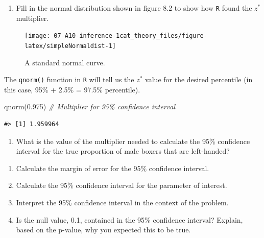 \documentclass[
]{report}
\newenvironment{Shaded}{\begin{snugshade}}{\end{snugshade}}
\newcommand{\CommentTok}[1]{\textcolor[rgb]{0.56,0.35,0.01}{\textit{#1}}}
\newcommand{\FloatTok}[1]{\textcolor[rgb]{0.00,0.00,0.81}{#1}}
\newcommand{\FunctionTok}[1]{\textcolor[rgb]{0.00,0.00,0.00}{#1}}
\newcommand{\NormalTok}[1]{#1}
\providecommand{\tightlist}{%
  \setlength{\itemsep}{0pt}\setlength{\parskip}{0pt}}
\begin{document}
\begin{enumerate}
\def\labelenumi{\arabic{enumi}.}
\setcounter{enumi}{14}
\tightlist
\item
  Fill in the normal distribution shown in figure 8.2 to show how \texttt{R} found the \(z^*\) multiplier.
\end{enumerate}

\begin{figure}

{\centering \texttt{[image: 07-A10-inference-1cat\_theory\_files/figure-latex/simpleNormaldist-1]} 

}

\caption{A standard normal curve.}\label{fig:simpleNormaldist}
\end{figure}

The \texttt{qnorm()} function in \texttt{R} will tell us the \(z^*\) value for the desired percentile (in this case, 95\% + 2.5\% = 97.5\% percentile).

\begin{Shaded}
\begin{Highlighting}[]
\FunctionTok{qnorm}\NormalTok{(}\FloatTok{0.975}\NormalTok{) }\CommentTok{\# Multiplier for 95\% confidence interval}
\end{Highlighting}
\end{Shaded}

\begin{verbatim}
#> [1] 1.959964
\end{verbatim}

\begin{enumerate}
\def\labelenumi{\arabic{enumi}.}
\setcounter{enumi}{15}
\tightlist
\item
  What is the value of the multiplier needed to calculate the 95\% confidence interval for the true proportion of male boxers that are left-handed?
\end{enumerate}

\vspace{0.3in}

\begin{enumerate}
\def\labelenumi{\arabic{enumi}.}
\setcounter{enumi}{16}
\item
  Calculate the margin of error for the 95\% confidence interval.
  \vspace{1in}
\item
  Calculate the 95\% confidence interval for the parameter of interest.
  \vspace{0.5in}
\item
  Interpret the 95\% confidence interval in the context of the problem.
  \vspace{1in}
\item
  Is the null value, 0.1, contained in the 95\% confidence interval? Explain, based on the p-value, why you expected this to be true.
  \vspace{1in}
\end{enumerate}
\end{document}
